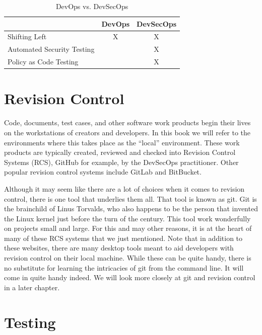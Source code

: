\begin{table}[ht]
    \centering
    \begin{tabular}{|l|c|c|}\hline
                                   & DevOps & DevSecOps \\\hline
        Shifting Left              &   X    &    X       \\\hline
        Automated Security Testing &        &    X       \\\hline
        Policy as Code Testing     &        &    X       \\\hline

    \end{tabular}
\caption{DevOps vs. DevSecOps}
\label{DevSecOps}
\end{table}

\section{Revision Control}

\justify{}
Code, documents, test cases, and other software work products begin their lives on the workstations of creators
and developers. In this book we will refer to the environments where this takes place as the ``local'' environment.
These work products are typically created, reviewed and checked into Revision Control Systems
(RCS), GitHub for example, by the DevSecOps practitioner.
Other popular revision control systems include GitLab and BitBucket.

\justify{}
Although it may seem like there are a lot of choices when it comes to revision control, there
is one tool that
underlies them all. That tool is known as git. Git is the brainchild of Linus Torvalds, who also
happens to be
the person that invented the Linux kernel just before the turn of the century. This tool work wonderfully
on projects small
and large. For this and may other reasons, it is at the heart of many of these RCS systems that we just mentioned. Note that
in addition to these websites, there are many desktop tools meant to aid developers with revision control on their local
machine. While these can be quite handy, there is no substitute for learning the intricacies of git from the command
line. It will come in quite handy indeed.
\justify{}
We will look more closely at git and revision control in a later chapter.

\section{Testing}

